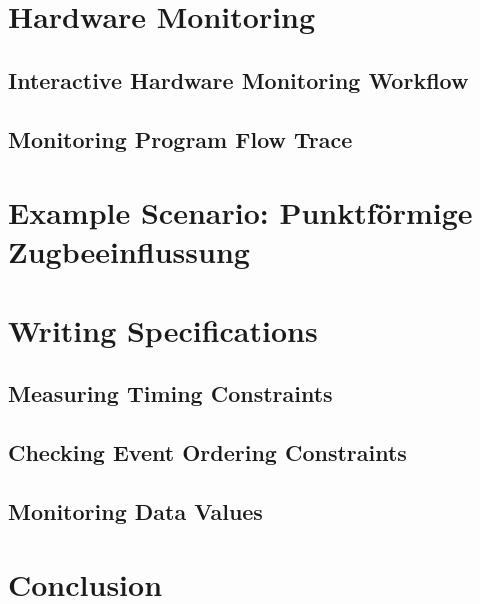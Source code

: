 \section{Hardware Monitoring}

\subsection[Interactive Workflow]{Interactive Hardware Monitoring Workflow}


\subsection[Program Flow]{Monitoring Program Flow Trace}


\section[Example Scenario]{Example Scenario: Punktförmige Zugbeeinflussung}


\section{Writing Specifications}

\subsection[Timing]{Measuring Timing Constraints}


\subsection[Event Ordering]{Checking Event Ordering Constraints}


\subsection[Data Values]{Monitoring Data Values}


\section*{Conclusion}

